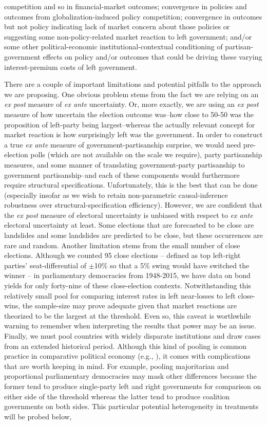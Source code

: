 \documentclass[12pt]{article}
\begin{document}
competition and so in financial-market outcomes; convergence in policies and outcomes from globalization-induced policy competition; convergence in outcomes but not policy indicating lack of market concern about those policies or suggesting some non-policy-related market reaction to left government; and/or some other political-economic institutional-contextual conditioning of partisan-government effects on policy and/or outcomes that could be driving these varying interest-premium costs of left government.

There are a couple of important limitations and potential pitfalls to the approach we are proposing. One obvious problem stems from the fact we are relying on an \textit{ex post} measure of \textit{ex ante} uncertainty. Or, more exactly, we are using an \textit{ex post} measure of how uncertain the election outcome was--how close to 50-50 was the proposition of left-party being largest--whereas the actually relevant concept for market reaction is how surprisingly left was the government. In order to construct a true \textit{ex ante} measure of government-partisanship surprise, we would need pre-election polls (which are not available on the scale we require), party partisanship measures, and some manner of translating government-party partisanship to government partisanship--and each of these components would furthermore require structural specifications. Unfortunately, this is the best that can be done (especially insofar as we wish to retain non-parametric causal-inference robustness over structural-specification efficiency). However, we are confident that the \textit{ex post} measure of electoral uncertainty is unbiased with respect to \textit{ex ante} electoral uncertainty at least. Some elections that are forecasted to be close are landslides and some landslides are predicted to be close, but these occurrences are rare and random. Another limitation stems from the small number of close elections. Although we counted 95 close elections -- defined as top left-right parties' seat-differential of $\pm$10\% so that a 5\% swing would have switched the winner -- in parliamentary democracies from 1948-2015, we have data on bond yields for only forty-nine of these close-election contexts. Notwithstanding this relatively small pool for comparing interest rates in left near-losses to left close-wins, the sample-size may prove adequate given that market reactions are theorized to be the largest at the threshold. Even so, this caveat is worthwhile warning to remember when interpreting the results that power may be an issue. Finally, we must pool countries with widely disparate institutions and draw cases from an extended historical period. Although this kind of pooling is common practice in comparative political economy (e.g., \citet{Beck1995}), it comes with complications that are worth keeping in mind. For example, pooling majoritarian and proportional parliamentary democracies may mask other differences because the former tend to produce single-party left and right governments for comparison on either side of the threshold whereas the latter tend to produce coalition governments on both sides. This particular potential heterogeneity in treatments will be probed below, 
\end{document}
